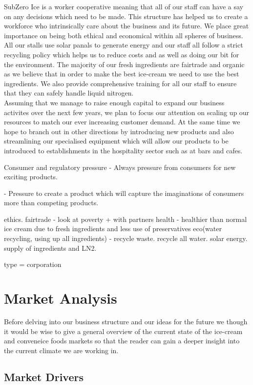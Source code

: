 \documentclass{article}
\begin{document}
SubZero Ice is a worker cooperative meaning that all of our staff can have a say on any decisions which need to be made. This structure has helped us to create a workforce who intrinsically care about the business and its future. We place great importance on being both ethical and economical within all spheres of business. All our stalls use solar panals to generate energy and our staff all follow a strict recycling policy which helps us to reduce costs and as well as doing our bit for the environment. The majority of our fresh ingredients are fairtrade and organic as we believe that in order to make the best ice-cream we need to use the best ingredients. We also provide comprehensive training for all our staff to ensure that they can safely handle liquid nitrogen. \\

Assuming that we manage to raise enough capital to expand our business activites over the next few years, we plan to focus our attention on scaling up our resources to match our ever increasing customer demand. At the same time we hope to branch out in other directions by introducing new products and also streamlining our specialised equipment which will allow our products to be introduced to establishments in the hospitality sector such as at bars and cafes.


%
Consumer and regulatory pressure
 - Always pressure from consumers for new exciting products.

 - Pressure to create a product which will capture the imaginations of
consumers more than competing products.

ethics.
fairtrade - look at poverty + with partners
health - healthier than normal ice cream due to fresh ingredients and less use of preservatives
eco(water recycling, using up all ingredients) - recycle waste. recycle all water. solar energy. supply of ingredients and LN2.

type = corporation
%

\section{Market Analysis}
  
  Before delving into our business structure and our ideas for the future we though it would be wise to give a general overview of the current state of the ice-cream and conveneice foods markets so that the reader can gain a deeper insight into the current climate we are working in.

  \subsection{Market Drivers}
\end{document}
